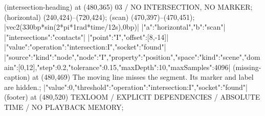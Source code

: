 \documentclass{article}
\begin{document}
\begin{loomscene}[width=960,height=540,duration=12,title={Describe the relationship}]
\loomnode[label,text=coral] (intersection-heading) at (480,365) {03 / NO INTERSECTION, NO MARKER};
\loomgeometry[draw=rule,line width=2bp] (horizontal) {(240,424)--(720,424)};
\loomgeometry[draw=ink,line width=1.6bp] (scan) {(470,397)--(470,451)};
|vec2(330bp*sin(2*pi*1rad*time/12s),0bp)|
|{"a":"horizontal","b":"scan"}|
|{"intersections":"contacts"}|
|{"point":"I","offset":[8,-14]}|
|{"value":{"operation":"intersection:I","socket":"found"}}|
|{"source":{"kind":"node","node":"I","property":"position","space":{"kind":"scene"}},"domain":[0,12],"step":0.2,"tolerance":0.15,"maxDepth":10,"maxSamples":4096}|
\loomnode[small,text=coral] (missing-caption) at (480,469) {The moving line misses the segment. Its marker and label are hidden.};
|{"value":0,"threshold":{"operation":"intersection:I","socket":"found"}}|
\loomnode[small] (footer) at (480,520) {TEXLOOM / EXPLICIT DEPENDENCIES / ABSOLUTE TIME / NO PLAYBACK MEMORY};
\end{loomscene}
\end{document}
